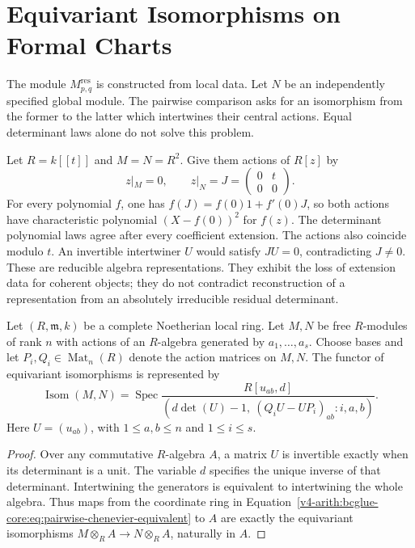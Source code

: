 \section{Equivariant Isomorphisms on Formal Charts}
\label{v4-arith:bcglue-core:core-theorem}

The module $M_{p,q}^{\mathrm{res}}$ is constructed from local data.
Let $N$ be an independently specified global module.
The pairwise comparison asks for an isomorphism from the former
to the latter which intertwines their central actions.
Equal determinant laws alone do not solve this problem.

\begin{example}
\label{v4-arith:bcglue-core:ex:extension-data}
Let $R=k[[t]]$ and $M=N=R^2$. Give them actions of $R[z]$ by
\[
 z|_M=0,\qquad z|_N=J=\begin{pmatrix}0&t\\0&0\end{pmatrix}.
\]
For every polynomial $f$, one has
$f(J)=f(0)1+f'(0)J$, so both actions have characteristic
polynomial $(X-f(0))^2$ for $f(z)$.
The determinant polynomial laws agree after every coefficient
extension. The actions also coincide modulo $t$.
An invertible intertwiner $U$ would satisfy $JU=0$, contradicting
$J\ne0$. These are reducible algebra representations.
They exhibit the loss of extension data for coherent objects;
they do not contradict reconstruction of a representation from an
absolutely irreducible residual determinant.
\end{example}

\begin{proposition}
\label{v4-arith:bcglue-core:thm:pairwise-reduces-to-chenevier}
Let $(R,\mathfrak m,k)$ be a complete Noetherian local ring.
Let $M,N$ be free $R$-modules of rank $n$ with actions of an
$R$-algebra generated by $a_1,\ldots,a_s$.
Choose bases and let $P_i,Q_i\in\operatorname{Mat}_n(R)$ denote
the action matrices on $M,N$.
The functor of equivariant isomorphisms is represented by
\begin{equation}
\label{v4-arith:bcglue-core:eq:pairwise-chenevier-equivalent}
 \operatorname{Isom}(M,N)
 =\operatorname{Spec}
 \frac{R[u_{ab},d]}{
 (d\det(U)-1,\ (Q_iU-UP_i)_{ab}:i,a,b)}.
\end{equation}
Here $U=(u_{ab})$, with $1\le a,b\le n$ and $1\le i\le s$.
\end{proposition}

\begin{proof}
Over any commutative $R$-algebra $A$, a matrix $U$ is invertible
exactly when its determinant is a unit. The variable $d$ specifies
the unique inverse of that determinant. Intertwining the generators
is equivalent to intertwining the whole algebra. Thus maps from
the coordinate ring in
Equation~\eqref{v4-arith:bcglue-core:eq:pairwise-chenevier-equivalent}
to $A$ are exactly the equivariant
isomorphisms $M\otimes_R A\to N\otimes_R A$, naturally in $A$.
\end{proof}

